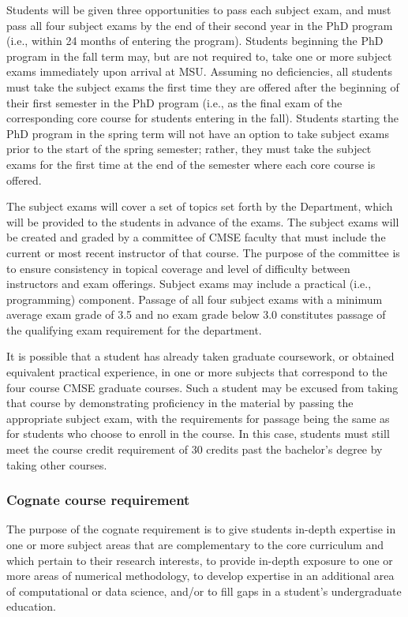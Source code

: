 Students will be given three opportunities to pass each subject exam,
and must pass all four subject exams by the end of their second year
in the PhD program (i.e., within 24 months of entering the program).
Students beginning the PhD program in the fall
term may, but are not required to, take one or more subject exams
immediately upon arrival at MSU.  Assuming no deficiencies, all
students must take the subject exams the first time they are offered
after the beginning of their first semester in the PhD program (i.e.,
as the final exam of the corresponding core course for students
entering in the fall).  Students starting the PhD program in the
spring term will not have an option to take subject exams prior to the
start of the spring semester; rather, they must take the subject exams
for the first time at the end of the semester where each core course
is offered.

The subject exams will cover a set of topics set forth by the
Department, which will be provided to the students in advance of the
exams. The subject exams will be created and graded by a committee of
CMSE faculty that must include the current or most recent instructor
of that course.  The purpose of the committee is to ensure consistency
in topical coverage and level of difficulty between instructors and
exam offerings.  Subject exams may include a practical (i.e.,
programming) component.  Passage of all four subject exams with a
minimum average exam grade of 3.5 and no exam grade below 3.0
constitutes passage of the qualifying exam requirement for the
department.

It is possible that a student has already taken graduate coursework,
or obtained equivalent practical experience, in one or more subjects
that correspond to the four course CMSE graduate courses.  Such a
student may be excused from taking that course by demonstrating
proficiency in the material by passing the appropriate subject exam,
with the requirements for passage being the same as for students who
choose to enroll in the course.  In this case, students must still
meet the course credit requirement of 30 credits past the bachelor's
degree by taking other courses.

\vspace{3mm}
\subsubsection{Cognate course requirement}

The purpose of the cognate requirement is to give students in-depth
expertise in one or more subject areas that are complementary to the
core curriculum and which pertain to their research interests, to
provide in-depth exposure to one or more areas of numerical
methodology, to develop expertise in an additional area of
computational or data science, and/or to fill gaps in a student's
undergraduate education.

